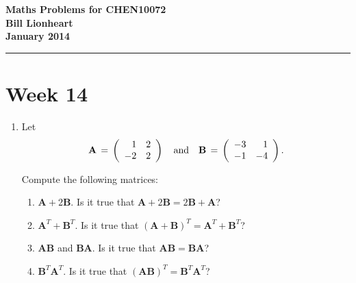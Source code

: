 \documentclass[11pt,a4paper]{article}
\def\bA{\mathbf{A}}
\def\bB{\mathbf{B}}
\begin{document}
\begin{center} 
{\bf Maths Problems for  CHEN10072 \\
%
{}%
Bill Lionheart\\
 January 2014}
\end{center}

\hrule
\smallskip
\section*{Week 14}

\begin{enumerate}

\item\label{q1167} Let
\[ \bA \,=\, \left( \begin{array}{rr} 1 &2 \\ -2 &2 \end{array} \right) \quad
\hbox{and} \quad
\bB \,=\, \left( \begin{array}{rr} -3 &1 \\ -1 &-4 \end{array} \right).\]

Compute the following matrices:
	\begin{enumerate}
	\item $\bA+ 2\bB$.  Is it true that $ \bA + 2\bB= 2\bB + \bA$?
	\item $\bA^T+  \bB^T$. Is it true that $( \bA + \bB)^T = \bA^T + \bB^T$?
	\item $\bA \bB$ and $\bB \bA$.    Is it true that $ \bA \bB= \bB \bA$?
	\item $\bB^T \bA^T$.  Is it true that $(\bA \bB)^T= \bB^T \bA^T$?
	\end{enumerate}

\end{enumerate}
\end{document}
